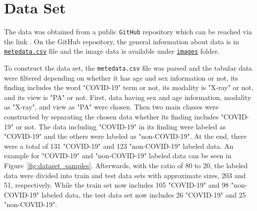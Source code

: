 \section{Data Set}

The data was obtained from a public \texttt{GitHub} repository which can be reached via the link \textcolor{blue}{}. On the GitHub repository, the general information about data is in \href{https://github.com/ieee8023/covid-chestxray-dataset/blob/master/metadata.csv}{\texttt{metedata.csv}} file and the image data is available under \href{https://github.com/ieee8023/covid-chestxray-dataset/tree/master/images}{\texttt{images}} folder.

To construct the data set, the \texttt{metedata.csv} file was parsed and the tabular data were filtered depending on whether it has age and sex information or not, its finding includes the word "COVID-19" term or not, its modality is "X-ray" or not, and its view is "PA" or not. First, data having sex and age information, modality as "X-ray", and view as "PA" were chosen. Then two main classes were constructed by separating the chosen data whether its finding includes "COVID-19" or not. The data including "COVID-19" in its finding were labeled as "COVID-19" and the others were labeled as "non-COVID-19". At the end, there were a total of 131 "COVID-19" and 123 "non-COVID-19" labeled data. An example for "COVID-19" and "non-COVID-19" labeled data can be seen in Figure~\ref{fig:dataset_samples}. Afterwards, with the ratio of 80 to 20, the labeled data were divided into train and test data sets with approximate sizes, 203 and 51, respectively. While the train set now includes 105 "COVID-19" and 98 "non-COVID-19" labeled data, the test data set now includes 26 "COVID-19" and 25 "non-COVID-19".



